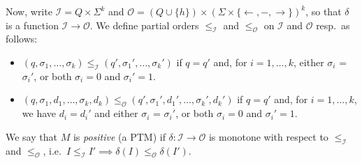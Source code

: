 \documentclass{lmcs}
\begin{document}
\begin{definition}
\smallskip


	Now, write $\mathcal I = Q \times \Sigma^k $ and $\mathcal O = ( Q \cup \{h\} )\times (\Sigma \times \{\leftarrow , - , \rightarrow \} )^k$, so that $\delta $ is a function $ \mathcal I \to \mathcal O$. 
	We define partial orders $\leq_\mathcal I$ and $\leq_\mathcal O$ on $\mathcal I$ and $\mathcal O$ resp.\ as follows: 
	\begin{itemize}
		\item $(q, \sigma_1 , \dots , \sigma_k) \leq_\mathcal I (q' , \sigma_1' , \dots , \sigma_k')$ if $q = q'$ and, for $i = 1 , \dots  ,k$, either $\sigma_i$ = $\sigma_i'$, or both $\sigma_i = 0$ and $\sigma_i' = 1$.
		\item $(q, \sigma_1 , d_1 , \dots , \sigma_k, d_k ) \leq_\mathcal O (q' , \sigma_1' , d_1' , \dots , \sigma_k' , d_k')$ if $q=q'$ and, for $i=1, \dots , k$, we have $d_i = d_i'$ and either $\sigma_i$ = $\sigma_i'$, or both $\sigma_i = 0$ and $\sigma_i' = 1$.
	\end{itemize}
\smallskip
We say that $M$ is \emph{positive} (a PTM) if $\delta : \mathcal I \to \mathcal O$ is monotone with respect to $\leq_\mathcal I $ and $\leq_\mathcal O$, i.e.\ $I \leq_\mathcal I I' \implies \delta(I) \leq_\mathcal O \delta(I')$.
	
	
%	
%	
%	
%	
%	
%	
%	
	

\end{definition}
\end{document}
